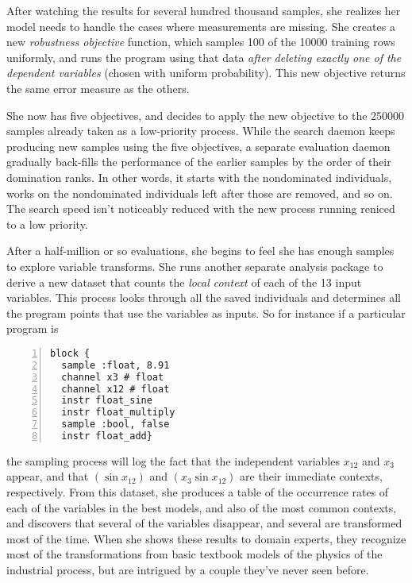 \documentclass[12pt]{article}
\begin{document}
After watching the results for several hundred thousand samples, she realizes her model needs to handle the cases where measurements are missing. She creates a new \emph{robustness objective} function, which samples 100 of the 10000 training rows uniformly, and runs the program using that data \emph{after deleting exactly one of the dependent variables} (chosen with uniform probability). This new objective returns the same error measure as the others.

She now has five objectives, and decides to apply the new objective to the 250000 samples already taken as a low-priority process. While the search daemon keeps producing new samples using the five objectives, a separate evaluation daemon gradually back-fills the performance of the earlier samples by the order of their domination ranks. In other words, it starts with the nondominated individuals, works on the nondominated individuals left after those are removed, and so on. The search speed isn't noticeably reduced with the new process running reniced to a low priority.

After a half-million or so evaluations, she begins to feel she has enough samples to explore variable transforms. She runs another separate analysis package to derive a new dataset that counts the \emph{local context} of each of the 13 input variables. This process looks through all the saved individuals and determines all the program points that use the variables as inputs. So for instance if a particular program is

\begin{Verbatim}[frame=single,numbers=left, xleftmargin=10mm, numbersep=1mm]
block {
  sample :float, 8.91
  channel x3 # float
  channel x12 # float
  instr float_sine
  instr float_multiply
  sample :bool, false
  instr float_add}
\end{Verbatim}
the sampling process will log the fact that the independent variables $x_{12}$ and $x_{3}$ appear, and that $(\sin x_{12})$ and $(x_{3} \sin{x_{12}})$ are their immediate contexts, respectively. From this dataset, she produces a table of the occurrence rates of each of the variables in the best models, and also of the most common contexts, and discovers that several of the variables disappear, and several are transformed most of the time. When she shows these results to domain experts, they recognize most of the transformations from basic textbook models of the physics of the industrial process, but are intrigued by a couple they've never seen before.
\end{document}
